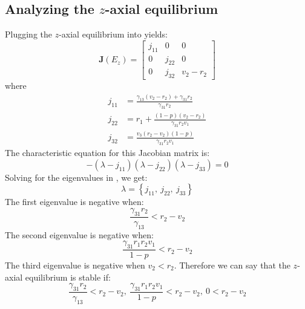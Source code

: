 \subsection{Analyzing the $z$-axial equilibrium}\label{subsec:stability_z_axial_equilibrium}
Plugging the $z$-axial equilibrium into  yields:
\begin{equation}
    \textbf{J}\left(E_z\right)=\begin{bmatrix}
        j_{11} & 0 & 0\\
        0 & j_{22} & 0\\
        0 & j_{32} & v_2-r_2
    \end{bmatrix}
    \label{eq:5.8}
\end{equation}
where
\begin{align*}
    j_{11} &= \frac{\gamma_{13}\left(v_2-r_2\right)+\gamma_{31}r_2}{\gamma_{31}r_2}\\
    j_{22} &= r_1+\frac{\left(1-p\right)\left(v_2-r_2\right)}{\gamma_{31}r_2v_1}\\
    j_{32} &= \frac{v_3\left(r_2-v_2\right)\left(1-p\right)}{\gamma_{31}r_2v_1}
\end{align*}
The characteristic equation for this Jacobian matrix is:
\begin{equation}
    -\left(\lambda-j_{11}\right)\left(\lambda-j_{22}\right)\left(\lambda-j_{33}\right)=0
    \label{eq:5.9}
\end{equation}
Solving for the eigenvalues in , we get:
\[
\lambda=\left\{
j_{11}, \
j_{22}, \
j_{33}
\right\}
\]
The first eigenvalue is negative when:
\[
\frac{\gamma_{31}r_2}{\gamma_{13}}<r_2-v_2
\]
The second eigenvalue is negative when:
\[
\frac{\gamma_{31}r_1r_2v_1}{1-p}<r_2-v_2
\]
The third eigenvalue is negative when $v_2<r_2$. Therefore we can say that the $z$-axial equilibrium is stable if:
\[
\frac{\gamma_{31}r_2}{\gamma_{13}}<r_2-v_2,\ \frac{\gamma_{31}r_1r_2v_1}{1-p}<r_2-v_2,\ 0<r_2-v_2
\]

